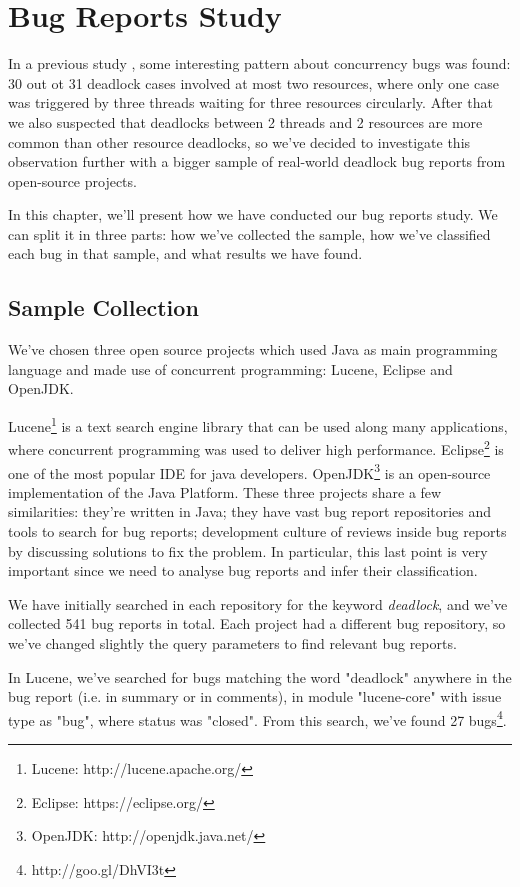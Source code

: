\chapter{Bug Reports Study}

In a previous study \cite{lu}, some interesting pattern about concurrency bugs was found: 30 out ot 31 deadlock cases involved at most two resources, where only one case was triggered by three threads waiting for three resources circularly. After that we also suspected that deadlocks between 2 threads and 2 resources are more common than other resource deadlocks, so we've decided to investigate this observation further with a bigger sample of real-world deadlock bug reports from open-source projects.

In this chapter, we'll present how we have conducted our bug reports study. We can split it in three parts: how we've collected the sample, how we've classified each bug in that sample, and what results we have found.

\section{Sample Collection}

We've chosen three open source projects which used Java as main programming language and made use of concurrent programming: Lucene, Eclipse and OpenJDK.

Lucene\footnote{Lucene: http://lucene.apache.org/} is a text search engine library that can be used along many applications, where concurrent programming was used to deliver high performance. Eclipse\footnote{Eclipse: https://eclipse.org/} is one of the most popular IDE for java developers. OpenJDK\footnote{OpenJDK: http://openjdk.java.net/} is an open-source implementation of the Java Platform. These three projects share a few similarities: they're written in Java; they have vast bug report repositories and tools to search for bug reports; development culture of reviews inside bug reports by discussing solutions to fix the problem. In particular, this last point is very important since we need to analyse bug reports and infer their classification.

We have initially searched in each repository for the keyword \emph{deadlock}, and we've collected 541 bug reports in total. Each project had a different bug repository, so we've changed slightly the query parameters to find relevant bug reports.

In Lucene, we've searched for bugs matching the word "deadlock" anywhere in the bug report (i.e. in summary or in comments), in module "lucene-core" with issue type as "bug", where status was "closed". From this search, we've found 27 bugs\footnote{http://goo.gl/DhVI3t}.

